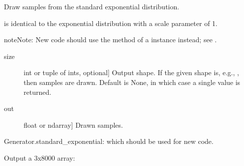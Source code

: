 \documentclass[letterpaper,10pt,english]{sphinxmanual}
\begin{document}
\begin{fulllineitems}
\label{\detokenize{infrapy.utils:infrapy.utils.ref2sac.standard_exponential}}
Draw samples from the standard exponential distribution.

 is identical to the exponential distribution
with a scale parameter of 1.

\begin{sphinxadmonition}{note}{Note:}
New code should use the  method of a 
instance instead; see .
\end{sphinxadmonition}
\begin{description}
\item[{size}] \leavevmode{[}int or tuple of ints, optional{]}
Output shape.  If the given shape is, e.g., , then
 samples are drawn.  Default is None, in which case a
single value is returned.

\end{description}
\begin{description}
\item[{out}] \leavevmode{[}float or ndarray{]}
Drawn samples.

\end{description}

Generator.standard\_exponential: which should be used for new code.

Output a 3x8000 array:

\begin{sphinxVerbatim}[commandchars=\\\{\}]
   
\end{sphinxVerbatim}

\end{fulllineitems}

\end{document}
